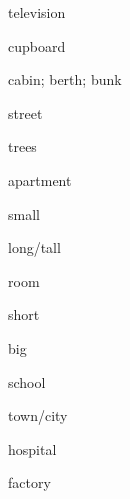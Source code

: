 \begin{flashcard}{\LARGE television}
\LARGE {}
\end{flashcard}
\begin{flashcard}{\LARGE cupboard}
\LARGE {}
\end{flashcard}
\begin{flashcard}{\LARGE cabin; berth; bunk}
\LARGE {}
\end{flashcard}
\begin{flashcard}{\LARGE street}
\LARGE {}
\end{flashcard}
\begin{flashcard}{\LARGE trees}
\LARGE {}
\end{flashcard}
\begin{flashcard}{\LARGE apartment}
\LARGE {}
\end{flashcard}
\begin{flashcard}{\LARGE small}
\LARGE {}
\end{flashcard}
\begin{flashcard}{\LARGE long/tall}
\LARGE {}
\end{flashcard}
\begin{flashcard}{\LARGE room}
\LARGE {}
\end{flashcard}
\begin{flashcard}{\LARGE short}
\LARGE {}
\end{flashcard}
\begin{flashcard}{\LARGE big}
\LARGE {}
\end{flashcard}
\begin{flashcard}{\LARGE school}
\LARGE {}
\end{flashcard}
\begin{flashcard}{\LARGE town/city}
\LARGE {}
\end{flashcard}
\begin{flashcard}{\LARGE hospital}
\LARGE {}
\end{flashcard}
\begin{flashcard}{\LARGE factory}
\LARGE {}
\end{flashcard}
